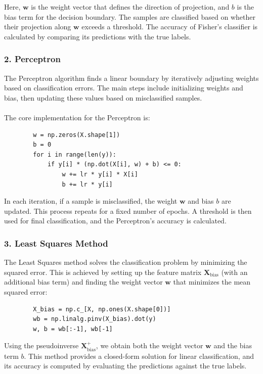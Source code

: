 \documentclass[a4paper, 11pt]{article}
\begin{document}
	Here, \( \mathbf{w} \) is the weight vector that defines the direction of projection, and \( b \) is the bias term for the decision boundary. The samples are classified based on whether their projection along \( \mathbf{w} \) exceeds a threshold. The accuracy of Fisher’s classifier is calculated by comparing its predictions with the true labels.
	
	\subsubsection*{2. Perceptron}
	
	The Perceptron algorithm finds a linear boundary by iteratively adjusting weights based on classification errors. The main steps include initializing weights and bias, then updating these values based on misclassified samples.
	\\\\
	The core implementation for the Perceptron is:
	
	\begin{verbatim}
		w = np.zeros(X.shape[1])
		b = 0
		for i in range(len(y)):
			if y[i] * (np.dot(X[i], w) + b) <= 0:
				w += lr * y[i] * X[i]
				b += lr * y[i]
	\end{verbatim}
	
	In each iteration, if a sample is misclassified, the weight \( \mathbf{w} \) and bias \( b \) are updated. This process repeats for a fixed number of epochs. A threshold is then used for final classification, and the Perceptron’s accuracy is calculated.
	
	\subsubsection*{3. Least Squares Method}
	
	The Least Squares method solves the classification problem by minimizing the squared error. This is achieved by setting up the feature matrix \( \mathbf{X}_{\text{bias}} \) (with an additional bias term) and finding the weight vector \( \mathbf{w} \) that minimizes the mean squared error:
	
	\begin{verbatim}
		X_bias = np.c_[X, np.ones(X.shape[0])]
		wb = np.linalg.pinv(X_bias).dot(y)
		w, b = wb[:-1], wb[-1]
	\end{verbatim}
	
	Using the pseudoinverse \( \mathbf{X}_{\text{bias}}^+ \), we obtain both the weight vector \( \mathbf{w} \) and the bias term \( b \). This method provides a closed-form solution for linear classification, and its accuracy is computed by evaluating the predictions against the true labels.
	
\end{document}
